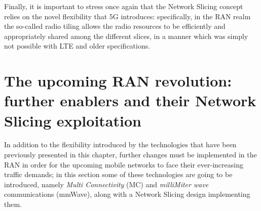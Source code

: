 \documentclass[11pt]{book}
\begin{document}
Finally, it is important to stress once again that the Network Slicing concept relies on the novel flexibility that 5G introduces: specifically, in the RAN realm the so-called radio tiling allows the radio resources to be efficiently and appropriately shared among the different slices, in a manner which was simply not possible with LTE and older specifications.

\section[The upcoming RAN revolution]{The upcoming RAN revolution: further enablers and their Network Slicing exploitation}
In addition to the flexibility introduced by the technologies that have been previously presented in this chapter, further changes must be implemented in the RAN in order for the upcoming mobile networks to face their ever-increasing traffic demands; in this section some of these technologies are going to be introduced, namely \textit{Multi Connectivity} (MC) and \textit{milliMiter wave} communications (mmWave), along with a Network Slicing design implementing them.
\end{document}
